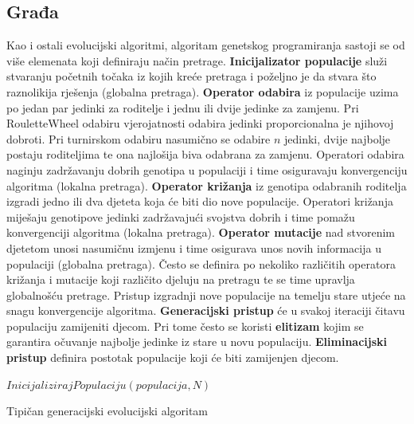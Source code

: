 \documentclass[times, utf8, numeric, diplomski]{fer}
\begin{document}
\subsection{Građa}
Kao i ostali evolucijski algoritmi, algoritam genetskog programiranja sastoji se od više elemenata koji definiraju način pretrage. \textbf{Inicijalizator populacije} služi stvaranju početnih točaka iz kojih kreće pretraga i poželjno je da stvara što raznolikija rješenja (globalna pretraga). \textbf{Operator odabira} iz populacije uzima po jedan par jedinki za roditelje i jednu ili dvije jedinke za zamjenu. Pri RouletteWheel odabiru vjerojatnosti odabira jedinki proporcionalna je njihovoj dobroti. Pri turnirskom odabiru nasumično se odabire $n$ jedinki, dvije najbolje postaju roditeljima te ona najlošija biva odabrana za zamjenu. Operatori odabira naginju zadržavanju dobrih genotipa u populaciji i time osiguravaju konvergenciju algoritma (lokalna pretraga). \textbf{Operator križanja} iz genotipa odabranih roditelja izgradi jedno ili dva djeteta koja će biti dio nove populacije. Operatori križanja miješaju genotipove jedinki zadržavajući svojstva dobrih i time pomažu konvergenciji algoritma (lokalna pretraga). \textbf{Operator mutacije} nad stvorenim djetetom unosi nasumičnu izmjenu i time osigurava unos novih informacija u populaciji (globalna pretraga). Često se definira po nekoliko različitih operatora križanja i mutacije koji različito djeluju na pretragu te se time upravlja globalnošću pretrage. Pristup izgradnji nove populacije na temelju stare utjeće na snagu konvergencije algoritma. \textbf{Generacijski pristup} će u svakoj iteraciji čitavu populaciju zamijeniti djecom. Pri tome često se koristi \textbf{elitizam} kojim se garantira očuvanje najbolje jedinke iz stare u novu populaciju. \textbf{Eliminacijski pristup} definira postotak populacije koji će biti zamijenjen djecom.
\newline
\newline
\begin{algorithm}[H]
\DontPrintSemicolon
{}
$InicijalizirajPopulaciju(populacija, N)$ \;
\;
\caption{Tipičan generacijski evolucijski algoritam}
\label{alg:ea}
\end{algorithm}
\end{document}
